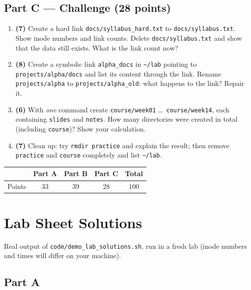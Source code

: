 \documentclass[11pt,a4paper]{article}
\newcommand{\cmd}[1]{\texttt{#1}}
\begin{document}
\subsection*{Part C --- Challenge (28 points)}
\begin{enumerate}[leftmargin=2.2em,label=\textbf{\arabic*.},start=14]
  \item \textbf{(7)} Create a hard link \texttt{docs/syllabus\_hard.txt} to \texttt{docs/syllabus.txt}. Show inode numbers and link counts. Delete \texttt{docs/syllabus.txt} and show that the data still exists. What is the link count now?
  \item \textbf{(8)} Create a symbolic link \texttt{alpha\_docs} in \texttt{\textasciitilde/lab} pointing to \texttt{projects/alpha/docs} and list its content through the link. Rename \texttt{projects/alpha} to \texttt{projects/alpha\_old}: what happens to the link? Repair it.
  \item \textbf{(6)} With \emph{one} command create \texttt{course/week01} \dots\ \texttt{course/week14}, each containing \texttt{slides} and \texttt{notes}. How many directories were created in total (including \texttt{course})? Show your calculation.
  \item \textbf{(7)} Clean up: try \cmd{rmdir practice} and explain the result; then remove \texttt{practice} and \texttt{course} completely and list \texttt{\textasciitilde/lab}.
\end{enumerate}

\begin{center}
\renewcommand{\arraystretch}{1.15}
\begin{tabular}{@{}lccc|c@{}}
\toprule
 & \textbf{Part A} & \textbf{Part B} & \textbf{Part C} & \textbf{Total} \\
\midrule
Points & $33$ & $39$ & $28$ & $100$ \\
\bottomrule
\end{tabular}
\end{center}

\section{Lab Sheet Solutions}

Real output of \cmd{code/demo\_lab\_solutions.sh}, run in a fresh lab (inode numbers and times will differ on your machine).

\subsection*{Part A}
\end{document}
